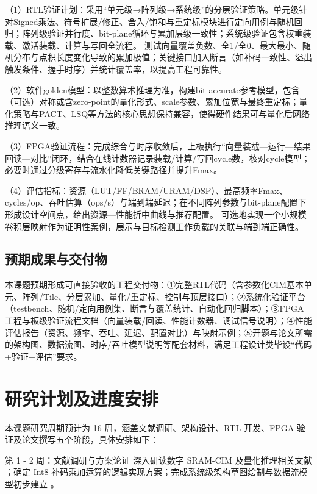 \documentclass[12pt, a4paper]{article}
\begin{document}
（1）RTL验证计划：采用“单元级→阵列级→系统级”的分层验证策略。单元级针对Signed乘法、符号扩展/修正、舍入/饱和与重定标模块进行定向用例与随机回归；阵列级验证并行度、bit-plane循环与累加层级一致性；系统级验证包含权重装载、激活装载、计算与写回全流程。\cite{12}\cite{16} 测试向量覆盖负数、全1/全0、最大最小、随机分布与点积长度变化导致的累加极值；关键接口加入断言（如补码一致性、溢出触发条件、握手时序）并统计覆盖率，以提高工程可靠性。\cite{12}\cite{6}


（2）软件golden模型：以整数算术推理为准，构建bit-accurate参考模型，包含（可选）对称或含zero-point的量化形式、scale参数、累加位宽与最终重定标；量化策略与PACT、LSQ等方法的核心思想保持兼容，使得硬件结果可与量化后网络推理语义一致。\cite{6}\cite{28}\cite{29}


（3）FPGA验证流程：完成综合与时序收敛后，上板执行“向量装载—运行—结果回读—对比”闭环，结合在线计数器记录装载/计算/写回cycle数，核对cycle模型；必要时通过分级寄存与流水化降低关键路径并提升Fmax。\cite{24}\cite{25}


（4）评估指标：资源（LUT/FF/BRAM/URAM/DSP）、最高频率Fmax、cycles/op、吞吐估算（ops/s）与端到端延迟；在不同阵列参数与bit-plane配置下形成设计空间点，给出资源—性能折中曲线与推荐配置。\cite{24}\cite{25}\cite{16} 可选地实现一个小规模卷积层映射作为证明性案例，展示与目标检测工作负载的关联与端到端正确性。\cite{10}\cite{11}\cite{3}
\subsection{预期成果与交付物}
本课题预期形成可直接验收的工程交付物：①完整RTL代码（含参数化CIM基本单元、阵列/Tile、分层累加、量化/重定标、控制与顶层接口）；②系统化验证平台（testbench、随机/定向用例集、断言与覆盖统计、自动化回归脚本）；③FPGA工程与板级验证流程文档（向量装载/回读、性能计数器、调试信号说明）；④性能评估报告（资源、频率、吞吐、延迟、配置对比）与映射示例；⑤开题与论文所需的架构图、数据流图、时序/吞吐模型说明等配套材料，满足工程设计类毕设“代码+验证+评估”要求。\cite{12}\cite{16}\cite{24}\cite{25}

\section{研究计划及进度安排}
本课题研究周期预计为 16 周，涵盖文献调研、架构设计、RTL 开发、FPGA 验证及论文撰写五个阶段，具体安排如下：


第 1 - 2 周：文献调研与方案论证 深入研读数字 SRAM-CIM 及量化推理相关文献 ；确定 Int8 补码乘加运算的逻辑实现方案；完成系统级架构草图绘制与数据流模型初步建立 。
\end{document}
